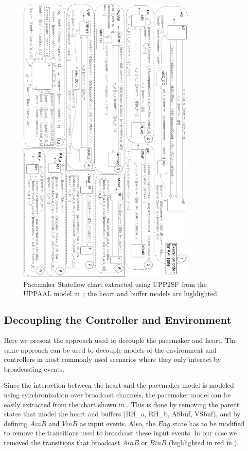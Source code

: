 \begin{figure} [!t]
\center
\includegraphics[width=0.8\textwidth]{figs/PM_SF_buffer_newC1.png} 
\caption{Pacemaker Stateflow chart extracted using UPP2SF from the UPPAAL model in~; the heart and buffer models are highlighted.} 
\label{fig:PM_sf}
\end{figure}


\subsection{Decoupling the Controller and Environment}
Here we present the approach used to decouple the pacemaker and heart. The same approach can be used to decouple models of the environment and controllers in most commonly used scenarios where they only interact by broadcasting events. 

 Since the interaction between the heart and the pacemaker model is modeled using synchronization over broadcast channels, the pacemaker model can be easily extracted from the chart shown in . This is done by removing the parent states that model the heart and buffers (RH\_a, RH\_b, ASbuf, VSbuf), and by defining $AinB$ and $VinB$ as input events. Also, the $Eng$ state has to be modified to remove the transitions used to broadcast these input events. In our case we removed the transitions that broadcast $AinB$ or $BinB$ (highlighted in red in ).


